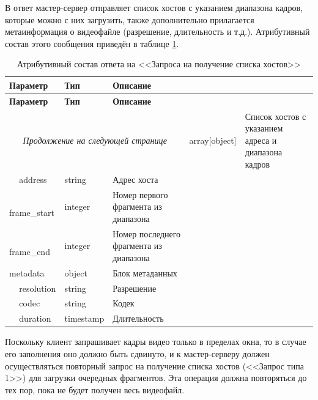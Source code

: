 В ответ мастер-сервер отправляет список хостов с указанием диапазона кадров, которые можно с них загрузить, также дополнительно прилагается метаинформация о видеофайле (разрешение, длительность и т.д.). Атрибутивный состав этого сообщения приведён в таблице \ref{tbl:get_hosts_response}. 

\begin{longtable}{|p{4cm}|p{3cm}|p{8.5cm}|}
	\caption{Атрибутивный состав ответа на <<Запроса на получение списка хостов>>}\label{tbl:get_hosts_response}\\
	\hline
	
	\textbf{Параметр} & \textbf{Тип} & \textbf{Описание}\\ 
	\hline
	\endfirsthead
	
	\hline
	\textbf{Параметр} & \textbf{Тип} & \textbf{Описание}\\ 
	\hline
	\endhead
	
	\hline
	\multicolumn{3}{c}{\textit{Продолжение на следующей странице}}
	\endfoot
	\hline
	\endlastfoot
	
	hosts & 
	array[object] & 
	Список хостов с указанием адреса и диапазона кадров \\
	
	\hline
	\,\,\,\,\,\,\,address & 
	string & 
	Адрес хоста \\
	
	\hline
	\,\,\,\,\,\,\,frame\_start & 
	integer & 
	Номер первого фрагмента из диапазона \\
	
	\hline
	\,\,\,\,\,\,\,frame\_end & 
	integer & 
	Номер последнего фрагмента из диапазона \\
	
	\hline
	metadata & 
	object & 
	Блок метаданных \\
	
	\hline
	\,\,\,\,\,\,\,resolution & 
	string & 
	Разрешение \\
	
	\hline
	\,\,\,\,\,\,\,codec & 
	string & 
	Кодек \\
	
	\hline
	\,\,\,\,\,\,\,duration & 
	timestamp & 
	Длительность \\
\end{longtable}

Поскольку клиент запрашивает кадры видео только в пределах окна, то в случае его заполнения оно должно быть сдвинуто, и к мастер-серверу должен осуществляться повторный запрос на получение списка хостов (<<Запрос типа 1>>) для загрузки очередных фрагментов. Эта операция должна повторяться до тех пор, пока не будет получен весь видеофайл.

